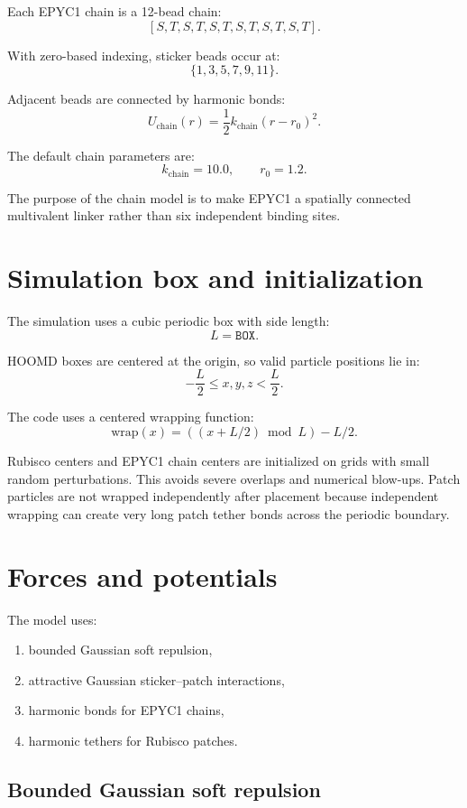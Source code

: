 \documentclass[11pt]{article}
\begin{document}
Each EPYC1 chain is a 12-bead chain:
\[
[S,T,S,T,S,T,S,T,S,T,S,T].
\]

With zero-based indexing, sticker beads occur at:
\[
\{1,3,5,7,9,11\}.
\]

Adjacent beads are connected by harmonic bonds:
\[
U_{\mathrm{chain}}(r)
=
\frac{1}{2}k_{\mathrm{chain}}(r-r_0)^2.
\]

The default chain parameters are:
\[
k_{\mathrm{chain}} = 10.0,
\qquad
r_0 = 1.2.
\]

The purpose of the chain model is to make EPYC1 a spatially connected multivalent linker rather than six independent binding sites.

\section{Simulation box and initialization}

The simulation uses a cubic periodic box with side length:
\[
L = \texttt{BOX}.
\]

HOOMD boxes are centered at the origin, so valid particle positions lie in:
\[
-\frac{L}{2} \le x,y,z < \frac{L}{2}.
\]

The code uses a centered wrapping function:
\[
\mathrm{wrap}(x) = \left((x+L/2)\bmod L\right)-L/2.
\]

Rubisco centers and EPYC1 chain centers are initialized on grids with small random perturbations. This avoids severe overlaps and numerical blow-ups. Patch particles are not wrapped independently after placement because independent wrapping can create very long patch tether bonds across the periodic boundary.

\section{Forces and potentials}

The model uses:
\begin{enumerate}[label=\arabic*.]
    \item bounded Gaussian soft repulsion,
    \item attractive Gaussian sticker--patch interactions,
    \item harmonic bonds for EPYC1 chains,
    \item harmonic tethers for Rubisco patches.
\end{enumerate}

\subsection{Bounded Gaussian soft repulsion}
\end{document}
